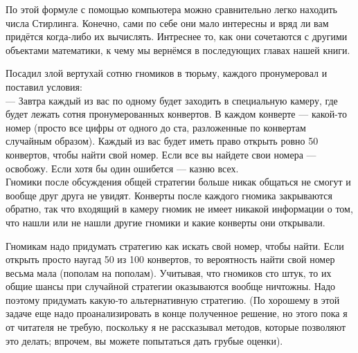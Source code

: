 По этой формуле с помощью компьютера можно сравнительно легко находить числа Стирлинга. Конечно, сами по себе они мало интересны и вряд ли вам придётся когда-либо их вычислять. Интреснее то, как они сочетаются с другими объектами математики, к чему мы вернёмся в последующих главах нашей книги.

\begin{exercise}
Посадил злой вертухай сотню гномиков в тюрьму, каждого пронумеровал и поставил условия:\\
— Завтра каждый из вас по одному будет заходить в специальную камеру, где будет лежать сотня пронумерованных конвертов. В каждом конверте — какой-то номер (просто все цифры от одного до ста, разложенные по конвертам случайным образом). Каждый из вас будет иметь право открыть ровно 50 конвертов, чтобы найти свой номер. Если все вы найдете свои номера — освобожу. Если хотя бы один ошибется — казню всех.\\
Гномики после обсуждения общей стратегии больше никак общаться не смогут и вообще друг друга не увидят. Конверты после каждого гномика закрываются обратно, так что входящий в камеру гномик не имеет никакой информации о том, что нашли или не нашли другие гномики и какие конверты они открывали.

Гномикам надо придумать стратегию как искать свой номер, чтобы найти. Если открыть просто наугад 50 из 100 конвертов, то вероятность найти свой номер весьма мала (пополам на пополам). Учитывая, что гномиков сто штук, то их общие шансы при случайной стратегии оказываются вообще ничтожны. Надо поэтому придумать какую-то альтернативную стратегию. (По хорошему в этой задаче еще надо проанализировать в конце полученное решение, но этого пока я от читателя не требую, поскольку я не рассказывал методов, которые позволяют это делать; впрочем, вы можете попытаться дать грубые оценки).
\end{exercise}